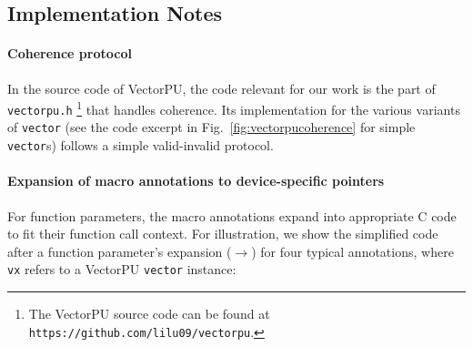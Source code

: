 \subsection{Implementation Notes}

\paragraph{Coherence protocol}
%
In the source code of VectorPU, the code
relevant for our work is the part of \verb+vectorpu.h+%
\footnote{The VectorPU source code can be found at
\texttt{https://github.com/lilu09/vectorpu}.} 
that handles coherence. Its implementation for the various
variants of \texttt{vector} 
(see the code excerpt in Fig.~\ref{fig:vectorpucoherence} for
simple \texttt{vector}s) follows a
simple valid-invalid protocol.

\paragraph{Expansion of macro annotations to device-specific pointers}

For function parameters, the macro annotations expand into appropriate C code to fit their function call context.
For illustration, we show the simplified code after a function parameter's expansion ($\longrightarrow$) for four typical annotations,
where \texttt{vx} refers to a VectorPU \texttt{vector} instance:

